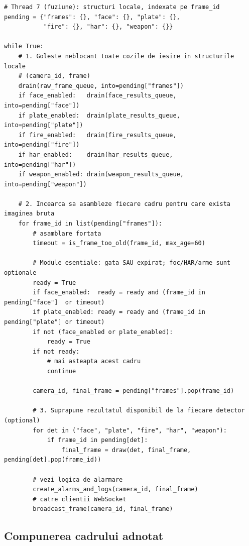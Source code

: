 \documentclass[../../main.tex]{subfiles}
\begin{document}
\begin{listing}[H]
\begin{verbatim}
# Thread 7 (fuziune): structuri locale, indexate pe frame_id
pending = {"frames": {}, "face": {}, "plate": {},
           "fire": {}, "har": {}, "weapon": {}}

while True:
    # 1. Goleste neblocant toate cozile de iesire in structurile locale
    # (camera_id, frame)
    drain(raw_frame_queue, into=pending["frames"])
    if face_enabled:   drain(face_results_queue,   into=pending["face"])
    if plate_enabled:  drain(plate_results_queue,  into=pending["plate"])
    if fire_enabled:   drain(fire_results_queue,   into=pending["fire"])
    if har_enabled:    drain(har_results_queue,    into=pending["har"])
    if weapon_enabled: drain(weapon_results_queue, into=pending["weapon"])

    # 2. Incearca sa asambleze fiecare cadru pentru care exista imaginea bruta
    for frame_id in list(pending["frames"]):
        # asamblare fortata
        timeout = is_frame_too_old(frame_id, max_age=60)

        # Module esentiale: gata SAU expirat; foc/HAR/arme sunt optionale
        ready = True
        if face_enabled:  ready = ready and (frame_id in pending["face"]  or timeout)
        if plate_enabled: ready = ready and (frame_id in pending["plate"] or timeout)
        if not (face_enabled or plate_enabled):
            ready = True
        if not ready:
            # mai asteapta acest cadru
            continue

        camera_id, final_frame = pending["frames"].pop(frame_id)

        # 3. Suprapune rezultatul disponibil de la fiecare detector (optional)
        for det in ("face", "plate", "fire", "har", "weapon"):
            if frame_id in pending[det]:
                final_frame = draw(det, final_frame, pending[det].pop(frame_id))

        # vezi logica de alarmare
        create_alarms_and_logs(camera_id, final_frame)
        # catre clientii WebSocket
        broadcast_frame(camera_id, final_frame)
\end{verbatim}
\caption{Firul de fuziune și politica \emph{ultimul cadru disponibil} (\texttt{merging\_thread} din \texttt{app.py}).}
\label{lst:merging}
\end{listing}

\subsection{Compunerea cadrului adnotat}
\label{subsec:compunere}
\end{document}
